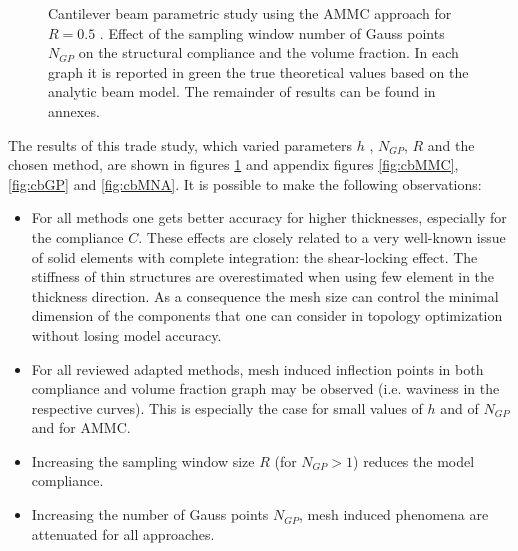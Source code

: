 \begin{figure}[!ht]
\centering
    \caption{Cantilever beam parametric study using the AMMC approach for $R=0.5$ . Effect of the sampling window number of Gauss points $N_{GP}$ on the structural compliance and the volume fraction. In each graph it is reported in green the true theoretical values based on the analytic beam model. The remainder of results can be found in annexes.}%
    \label{fig:cbMMCtext}%
\end{figure}
The results of this trade study, which varied parameters $h$ , $N_{GP}$, $R$ and the chosen method, are shown in figures \ref{fig:cbMMCtext} and appendix figures \ref{fig:cbMMC},\ref{fig:cbGP} and \ref{fig:cbMNA}. It is possible to make the following observations:
\begin{itemize}
\item For all methods one gets better accuracy for higher thicknesses, especially for the compliance $C$. These effects are closely related to a very well-known issue of solid elements with complete integration: the shear-locking effect. The stiffness of thin structures are overestimated when using few element in the thickness direction. As a consequence the mesh size can control the minimal dimension of the components that one can consider in topology optimization without losing model accuracy.
\item For all reviewed adapted methods, mesh induced inflection points in both compliance and volume fraction graph may be observed (i.e. waviness in the respective curves). This is especially the case for small values of $h$ and of $N_{GP}$ and for AMMC. 
\item Increasing the sampling window size $R$ (for $N_{GP}>1$) reduces the model compliance.
\item Increasing the number of Gauss points $N_{GP}$, mesh induced phenomena are attenuated for all approaches. 
\end{itemize}
